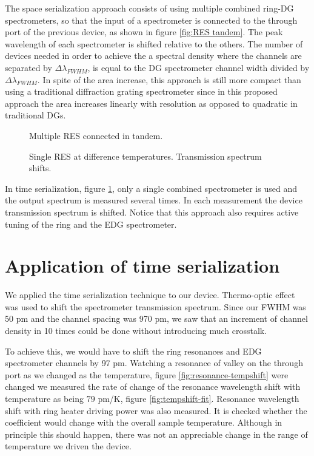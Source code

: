 \documentclass[12pt,twoside,english]{book}
\renewcommand{\~}{\perispomeni}%
\numberwithin{equation}{section}
\numberwithin{figure}{section}
\begin{document}
The space serialization approach consists of using multiple combined ring-DG spectrometers, so that the input of a spectrometer is connected to the through port of the previous device, as shown in figure \ref{fig:RES tandem}. The peak wavelength of each spectrometer is shifted relative to the others. The number of devices needed in order to achieve the a spectral density where the channels are separated by $\Delta\lambda_{FWHM}$, is equal to the DG spectrometer channel width divided by $\Delta\lambda_{FWHM}$. In spite of the area increase, this approach is still more compact than using a traditional diffraction grating spectrometer since in this proposed approach the area increases linearly with resolution as opposed to quadratic in traditional DGs.
\begin{figure}[h]
	\begin{minipage}[t]{0.49\columnwidth}%
		\caption{Multiple RES connected in tandem.\label{fig:RES tandem}}
	\end{minipage}\hfill{}%
	\begin{minipage}[t]{0.49\columnwidth}%
		\caption{Single RES at difference temperatures. Transmission spectrum shifts.\label{fig:RES temperature}}
	\end{minipage}
\end{figure}

In time serialization, figure \ref{fig:RES temperature}, only a single combined spectrometer is used and the output spectrum is measured several times. In each measurement the device transmission spectrum is shifted. Notice that this approach also requires active tuning of the ring and the EDG spectrometer. 

\section{Application of time serialization}
We applied the time serialization technique to our device. Thermo-optic effect was used to shift the spectrometer transmission spectrum. Since our FWHM was 50 pm and the channel spacing was 970 pm, we saw that an increment of channel density in 10 times could be done without introducing much crosstalk.

To achieve this, we would have to shift the ring resonances and EDG spectrometer channels by 97 pm. Watching a resonance of valley on the through port as we changed as the temperature, figure \ref{fig:resonance-tempshift} were changed we measured the rate of change of the resonance wavelength shift with temperature as being $79$ pm/K, figure \ref{fig:tempshift-fit}.
Resonance wavelength shift with ring heater driving power was also measured. It is checked whether the coefficient would change with the overall sample temperature. Although in principle this should happen, there was not an appreciable change in the range of temperature we driven the device.
\end{document}

